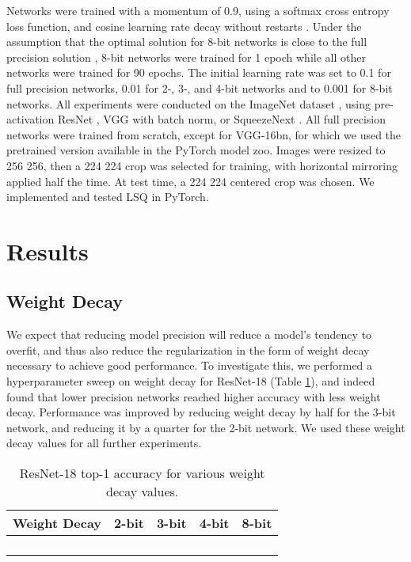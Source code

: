 \documentclass{article}
\begin{document}
Networks were trained with a momentum of 0.9, using a softmax cross entropy loss function, and cosine learning rate decay without restarts \citep{DBLP:journals/corr/LoshchilovH16a}.
Under the assumption that the optimal solution for 8-bit networks is close to the full precision solution \citep{mckinstry2018discovering}, 8-bit networks were trained for 1 epoch while all other networks were trained for 90 epochs.
The initial learning rate was set to 0.1 for full precision networks, 0.01 for 2-, 3-, and 4-bit networks and to 0.001 for 8-bit networks.
All experiments were conducted on the ImageNet dataset \citep{russakovsky2015imagenet}, using pre-activation ResNet \citep{he2016deep}, VGG \citep{simonyan2014very} with batch norm, or SqueezeNext \citep{gholami2018squeezenext}.
All full precision networks were trained from scratch, except for VGG-16bn, for which we used the pretrained version available in the PyTorch model zoo.
Images were resized to 256  256, then a 224  224 crop was selected for training, with horizontal mirroring applied half the time.  At test time, a 224  224 centered crop was chosen.
We implemented and tested LSQ in PyTorch.


\section{Results}


\subsection{Weight Decay}

We expect that reducing model precision will reduce a model's tendency to overfit, and thus also reduce the regularization in the form of weight decay necessary to achieve good performance.
To investigate this, we performed a hyperparameter sweep on weight decay for ResNet-18 (Table  \ref{table:weightdecay}),
and indeed found that lower precision networks reached higher accuracy with less weight decay.
Performance was improved by reducing weight decay by half for the 3-bit network, and reducing it by a quarter for the 2-bit network. We used these weight decay values for all further experiments.

\begin{table}[h]
	\caption{ResNet-18 top-1 accuracy for various weight decay values.}
	\label{table:weightdecay}
	\setlength\tabcolsep{6pt}
\begin{center}
	\begin{small}
\begin{tabular}{r c c c c}
Weight Decay & 2-bit & 3-bit & 4-bit & 8-bit \\
		\midrule
		 				&  			&  			& 	&  \\
		 		&  			&  	& 			&  \\
		 	&  	&  			&  			&  \\
		 	&  			&  			&  			&  \\
		\bottomrule
	\end{tabular}
\end{small}
	\end{center}
\end{table}
\end{document}

